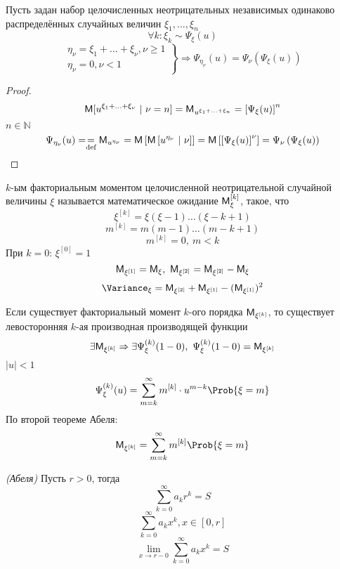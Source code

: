 \begin{theorem}
	Пусть задан набор целочисленных неотрицательных независимых одинаково распределённых случайных величин $\xi_1, \ldots, \xi_n$
\[
	\forall k: \xi_k \sim \Psi_{\xi} (u)
\]
\[
	\left.
	\begin{aligned}
	\eta_{\nu} = \xi_1 + \ldots + \xi_{\nu}, \nu \geqslant 1 \\
	\eta_{\nu} = 0, \nu < 1
	\end{aligned}
	\right	\} \Rightarrow \Psi_{\eta_{\nu}} (u) = \Psi_{\nu} (\Psi_{\xi} (u))
\]
\end{theorem}
\begin{proof}
\[
	\mathsf{M} [u^{\xi_1 + \ldots + \xi_{\nu}} \ | \ \nu = n] = \mathsf{M}_{u^{\xi_1 + \ldots + \xi_n}} = \left[ \Psi_{\xi} (u) \right]^n
\]
$n \in \mathbb{N}$
\[
	\Psi_{\eta_{\nu}} (u) = \underset{\textrm{def}}{=} \mathsf{M}_{u^{\eta_{\nu}}} = \mathsf{M} \left[ \mathsf{M} \left[ u^{\eta_{\nu}} \ | \ \nu \right] \right] = \mathsf{M} \left[ \left[ \Psi_{\xi} (u) \right]^{\nu} \right] = \Psi_{\nu} \left( \Psi_{\xi} (u)\right)
\]
\end{proof}
\begin{definition}
	$k$-ым факториальным моментом целочисленной неотрицательной случайной величины $\xi$ называется математическое ожидание $\mathsf{M}_{\xi}^{[k]}$, такое, что
    \[
	    \xi^{[k]} = \xi (\xi - 1) \ldots (\xi - k + 1)
    \] 
	\[
		m^{[k]} = m (m - 1) \ldots (m - k + 1)
	\]
	\[
		m^{[k]} = 0, \ m < k
	\]
	При $k = 0$: $\xi^{[0]} = 1$
	\[
		\MExpect_{\xi^{[1]}} = \MExpect_{\xi}, \ \MExpect_{\xi^{[2]}} = \MExpect_{\xi^{[2]}} - \MExpect_{\xi}
	\]
	\[
		\Variance_{\xi} = \MExpect_{\xi^{[2]}} + \MExpect_{\xi^{[1]}} - (\MExpect_{\xi^{[1]}})^2
	\]
\end{definition}
\begin{theorem}
	Если существует факториальный момент $k$-ого порядка $\mathsf{M}_{\xi^{[k]}}$, то существует левосторонняя $k$-ая производная производящей функции
	\[
		\exists \MExpect_{\xi^{[k]}} \Rightarrow \exists \Psi_{\xi}^{(k)} (1 - 0), \ \Psi_{\xi}^{(k)} (1 - 0) = \MExpect_{\xi^{[k]}}
	\]
$|u| < 1$
\[
	\Psi_{\xi}^{(k)} (u) = \sum\limits_{m = k}^{\infty} m^{[k]} \cdot u^{m - k} \Prob \{ \xi = m \}
\]
По второй теореме Абеля:
	\[
		\MExpect_{\xi^{[k]}} = \sum\limits_{m = k}^{\infty} m^{[k]} \Prob \{ \xi = m \}
	\]
\end{theorem}
\begin{theorem}
	\textit{(Абеля)} Пусть $r > 0$, тогда
	\[
		\sum\limits_{k = 0}^{\infty} a_k r^k = S
	\]
	\[
		\sum\limits_{k = 0}^{\infty} a_k x^k, x \in [0, r]
	\]
	\[
		\lim\limits_{x \to r - 0} \sum\limits_{k = 0}^{\infty} a_k x^k = S
	\]
\end{theorem}
